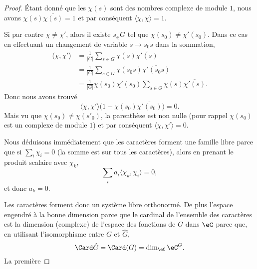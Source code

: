 \begin{proof}
    Étant donné que les \( \chi(s)\) sont des nombres complexe de module \( 1\), nous avons \( \chi(s)\overline{ \chi(s) }=1\) et par conséquent \( \langle \chi, \chi\rangle =1\).

    Si par contre \( \chi\neq\chi'\), alors il existe \( s_\in G\) tel que \( \chi(s_0)\neq \chi'(s_0)\). Dans ce cas en effectuant un changement de variable \( s\to s_0s\) dans la sommation,
    \begin{subequations}
        \begin{align}
            \langle \chi, \chi'\rangle &=\frac{1}{ | G | }\sum_{s\in G}\chi(s)\overline{ \chi'(s) }\\
            &=\frac{1}{ | G | }\sum_{s\in G}\chi(s_0s)\overline{ \chi'(s_0s) }\\
            &=\frac{1}{ | G | }\chi(s_0)\chi'(s_0)\sum_{s\in G}\chi(s)\overline{ \chi'(s) }.
        \end{align}
    \end{subequations}
    Donc nous avons trouvé
    \begin{equation}
        \langle \chi, \chi'\rangle \big( 1-\chi(s_0)\overline{ \chi'(s_0) } \big)=0.
    \end{equation}
    Mais vu que \( \chi(s_0)\neq \chi(s'_0)\), la parenthèse est non nulle (pour rappel \( \chi(s_0)\) est un complexe de module \( 1\)) et par conséquent \( \langle \chi, \chi'\rangle =0\).

    Nous déduisons immédiatement que les caractères forment une famille libre parce que si \( \sum_i\chi_i=0\) (la somme est sur tous les caractères), alors en prenant le produit scalaire avec \( \chi_k\),
    \begin{equation}
        \sum_ia_i\langle \chi_k, \chi_i\rangle =0,
    \end{equation}
    et donc \( a_k=0\).

    Les caractères forment donc un système libre orthonormé. De plus l'espace engendré à la bonne dimension parce que le cardinal de l'ensemble des caractères est la dimension (complexe) de l'espace des fonctions de \( G\) dans \( \eC\) parce que, en utilisant l'isomorphisme entre \( G\) et \( \hat G\),
    \begin{equation}
        \Card\hat G=\Card(G)=\dim_{\eC}\eC^G.
    \end{equation}
    La première
\end{proof}

